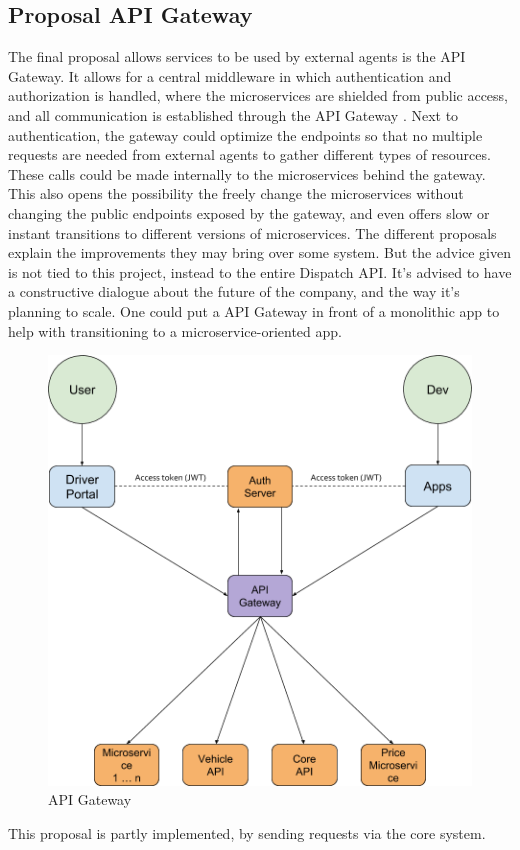 \subsection{Proposal API Gateway}
The final proposal allows services to be used by external agents is the API Gateway. It allows for a central middleware in which authentication and authorization is handled, where the microservices are shielded from public access, and all communication is established through the API Gateway \cite{api-gateway}. Next to authentication, the gateway could optimize the endpoints so that no multiple requests are needed from external agents to gather different types of resources. These calls could be made internally to the microservices behind the gateway. This also opens the possibility the freely change the microservices without changing the public endpoints exposed by the gateway, and even offers slow or instant transitions to different versions of microservices. The different proposals explain the improvements they may bring over some system. But the advice given is not tied to this project, instead to the entire Dispatch API. It’s advised to have a constructive dialogue about the future of the company, and the way it’s planning to scale. One could put a API Gateway in front of a monolithic app to help with transitioning to a microservice-oriented app.

\begin{figure}[H]
	\centering
	\includegraphics[width=.7\textwidth]{Auth3}
	\caption[API Gateway]{API Gateway}
	\label{fig:Auth3}
\end{figure}

This proposal is partly implemented, by sending requests via the core system.

